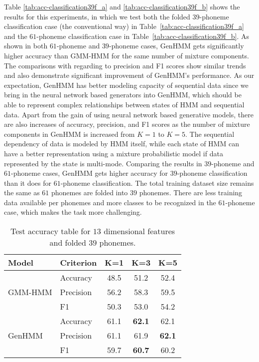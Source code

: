 Table \ref{tab:acc-classification39f_a} and \ref{tab:acc-classification39f_b} shows the results for this experiments, in which we test both the folded $39$-phoneme classification case (the conventional way) in Table~\ref{tab:acc-classification39f_a} and the $61$-phoneme classification case in Table~\ref{tab:acc-classification39f_b}. As shown in both $61$-phoneme and $39$-phoneme cases, GenHMM gets significantly higher accuracy than GMM-HMM for the same number of mixture components. The comparisons with regarding to precision and F1 scores show similar trends and also demonstrate significant improvement of GenHMM's performance. As our expectation, GenHMM has better modeling capacity of sequential data since we bring in the neural network based generators into GenHMM, which should be able to represent complex relationships between states of HMM and sequential data. Apart from the gain of using neural network based generative models, there are also increases of accuracy, precision, and F1 scores as the number of mixture components in GenHMM is increased from $K=1$ to $K=5$. The sequential dependency of data is modeled by HMM itself, while each state of HMM can have a better representation using a mixture probabilistic model if data represented by the state is multi-mode. Comparing the results in $39$-phoneme and $61$-phoneme cases, GenHMM gets higher accuracy for $39$-phoneme classification than it does for $61$-phoneme classification. The total training dataset size remains the same as $61$ phonemes are folded into $39$ phonemes. There are less training data available per phonemes and more classes to be recognized in the $61$-phoneme case, which makes the task more challenging.

\begin{table}
  \caption{Test accuracy table for $13$ dimensional features and folded $39$ phonemes.}\label{tab:acc-classification13f_a}
  \centering  
  \begin{tabular}{llccc}
    \toprule
    {Model} & Criterion & K=1 &  K=3 &  K=5  \\  \midrule
    \multirow{3}{*}{GMM-HMM}
            & Accuracy & 48.5 &  51.2 &  52.4  \\
            & Precision& 56.2 &  58.3 &  59.5  \\
            & F1       & 50.3 &  53.0 &  54.2  \\
    \midrule
    \multirow{3}{*}{GenHMM}
            & Accuracy & 61.1 &  \textbf{62.1} &  62.1   \\ 
            & Precision& 61.1 &  61.9 &  \textbf{62.1}  \\
            & F1       & 59.7 &  \textbf{60.7} &  60.2  \\

    \bottomrule                                                                  
  \end{tabular}
\end{table}

